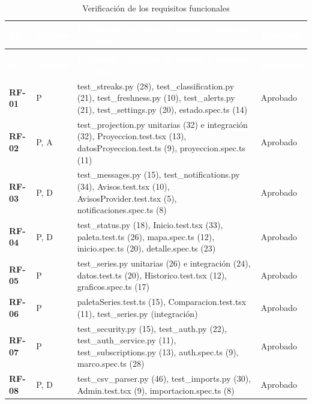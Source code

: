\documentclass[11pt,a4paper,oneside]{article}
\begin{document}
{\footnotesize
\begin{xltabular}{\textwidth}{@{}>{\sffamily\bfseries}p{1.3cm}>{\raggedright\arraybackslash}p{1.3cm}Y>{\raggedright\arraybackslash}p{1.8cm}@{}}
\caption{Verificación de los requisitos funcionales}\label{tab:verrf}\\
\textcolor{white}{\sffamily\bfseries\footnotesize RF} & \textcolor{white}{\sffamily\bfseries\footnotesize Método} & \textcolor{white}{\sffamily\bfseries\footnotesize Evidencia (archivos de prueba y número de casos)} & \textcolor{white}{\sffamily\bfseries\footnotesize Resultado}\\
\endfirsthead
{}\\
\textcolor{white}{\sffamily\bfseries\footnotesize RF} & \textcolor{white}{\sffamily\bfseries\footnotesize Método} & \textcolor{white}{\sffamily\bfseries\footnotesize Evidencia (archivos de prueba y número de casos)} & \textcolor{white}{\sffamily\bfseries\footnotesize Resultado}\\
\endhead
RF-01 & P & test\_streaks.py (28), test\_classification.py (21), test\_freshness.py (10), test\_alerts.py (21), test\_settings.py (20), estado.spec.ts (14) & Aprobado\\ \hline
{}RF-02 & P, A & test\_projection.py unitarias (32) e integración (32), Proyeccion.test.tsx (13), datosProyeccion.test.ts (9), proyeccion.spec.ts (11) & Aprobado\\ \hline
RF-03 & P, D & test\_messages.py (15), test\_notifications.py (34), Avisos.test.tsx (10), AvisosProvider.test.tsx (5), notificaciones.spec.ts (8) & Aprobado\\ \hline
{}RF-04 & P, D & test\_status.py (18), Inicio.test.tsx (33), paleta.test.ts (26), mapa.spec.ts (12), inicio.spec.ts (20), detalle.spec.ts (23) & Aprobado\\ \hline
RF-05 & P & test\_series.py unitarias (26) e integración (24), datos.test.ts (20), Historico.test.tsx (12), graficos.spec.ts (17) & Aprobado\\ \hline
{}RF-06 & P & paletaSeries.test.ts (15), Comparacion.test.tsx (11), test\_series.py (integración) & Aprobado\\ \hline
RF-07 & P & test\_security.py (15), test\_auth.py (22), test\_auth\_service.py (11), test\_subscriptions.py (13), auth.spec.ts (9), marco.spec.ts (28) & Aprobado\\ \hline
{}RF-08 & P, D & test\_csv\_parser.py (46), test\_imports.py (30), Admin.test.tsx (9), importacion.spec.ts (8) & Aprobado\\ \hline
\end{xltabular}}
\vspace{0.6em}
\end{document}
